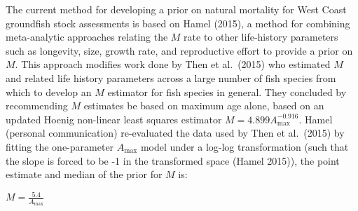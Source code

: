 \documentclass[11pt,
  english,
  a4paper,
]{article}
\begin{document}
The current method for developing a prior on natural mortality for West Coast groundfish stock assessments is based on Hamel {(2015)\leavevmode\tagmcend\tagstructend}, a method for combining meta-analytic approaches relating the {\(M\)\leavevmode\tagmcend\tagstructend} rate to other life-history parameters such as longevity, size, growth rate, and reproductive effort to provide a prior on {\(M\)\leavevmode\tagmcend\tagstructend}. This approach modifies work done by Then et al.~{(2015)\leavevmode\tagmcend\tagstructend} who estimated {\(M\)\leavevmode\tagmcend\tagstructend} and related life history parameters across a large number of fish species from which to develop an {\(M\)\leavevmode\tagmcend\tagstructend} estimator for fish species in general. They concluded by recommending {\(M\)\leavevmode\tagmcend\tagstructend} estimates be based on maximum age alone, based on an updated Hoenig non-linear least squares estimator {\(M = 4.899A^{-0.916}_{\text{max}}\)\leavevmode\tagmcend\tagstructend}. Hamel (personal communication) re-evaluated the data used by Then et al.~{(2015)\leavevmode\tagmcend\tagstructend} by fitting the one-parameter {\(A_{\text{max}}\)\leavevmode\tagmcend\tagstructend} model under a log-log transformation (such that the slope is forced to be -1 in the transformed space {(Hamel 2015)\leavevmode\tagmcend\tagstructend}), the point estimate and median of the prior for {\(M\)\leavevmode\tagmcend\tagstructend} is:

\leavevmode\tagmcend\tagstructend\par

\begin{centering}

$M=\frac{5.4}{A_{\text{max}}}$

\end{centering}

\vspace{0.5cm}
\end{document}
